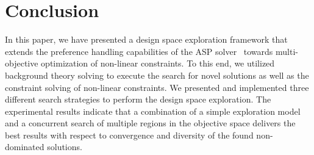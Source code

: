 \section{Conclusion}
In this paper, we have presented a design space exploration framework that extends the preference handling capabilities of the \acf{ASP} solver \clingo\ towards multi-objective optimization of non-linear constraints. To this end, we utilized background theory solving to execute the search for novel solutions as well as the constraint solving of non-linear constraints. We presented and implemented three different search strategies to perform the design space exploration. The experimental results indicate that a combination of a simple exploration model and a concurrent search of multiple regions in the objective space delivers the best results with respect to convergence and diversity of the found non-dominated solutions. \par
\label{sec:conclusion}
